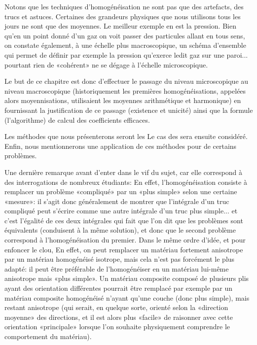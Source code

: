 \medskip{}
Notons que les techniques d'homogénéisation ne sont pas que des artefacts, des trucs et astuces.
Certaines des grandeurs physiques que nous utilisons tous les jours ne sont que des moyennes. Le meilleur exemple en est la pression. Bien qu'en un point donné d'un gaz on voit passer des particules allant en tous sens, on constate également, à une échelle plus macroscopique, un schéma d'ensemble qui permet de définir par exemple la pression qu'exerce ledit gaz sur une paroi... pourtant rien de «cohérent» ne se dégage à l'échelle microscopique.

\medskip
Le but de ce chapitre est donc d'effectuer le passage du niveau microscopique au niveau macroscopique (historiquement les premières homogénéisations, appelées alors moyennisations, utilisaient les moyennes arithmétique et harmonique) en fournissant la justification de ce passage (existence et unicité) ainsi que la formule (l'algorithme) de calcul des coefficients efficaces.

\medskip
Les méthodes que nous présenterons seront les  Le cas des  sera ensuite considéré. Enfin, nous mentionnerons une application de ces méthodes pour  de certains problèmes.

\medskip
Une dernière remarque avant d'enter dans le vif du sujet, car elle correspond à des interrogations de nombreux étudiants:  En effet, l'homogénéisation consiste à remplacer un problème «compliqué» par un «plus simple» selon une certaine «mesure»: il s'agit donc généralement de montrer que l'intégrale d'un truc compliqué peut s'écrire comme une autre intégrale d'un truc plus simple... et c'est l'égalité de ces deux intégrales qui fait que l'on dit que les problèmes sont équivalents (conduisent à la même solution), et donc que le second problème correspond à l'homogénéisation du premier. Dans le même ordre d'idée, et pour enfoncer le clou,  En effet, on peut remplacer un matériau fortement anisotrope par un matériau homogénéisé isotrope, mais cela n'est pas forcément le plus adapté: il peut être préférable de l'homogénéiser en un matériau lui-même anisotrope mais «plus simple». Un matériau composite composé de plusieurs plis ayant des orientation différentes pourrait être remplacé par exemple par un matériau composite homogénéisé n'ayant qu'une couche (donc plus simple), mais restant anisotrope (qui serait, en quelque sorte, orienté selon la «direction moyenne» des directions, et il est alors plus «facile» de raisonner avec cette orientation «principale» lorsque l'on souhaite physiquement comprendre le comportement du matériau).


